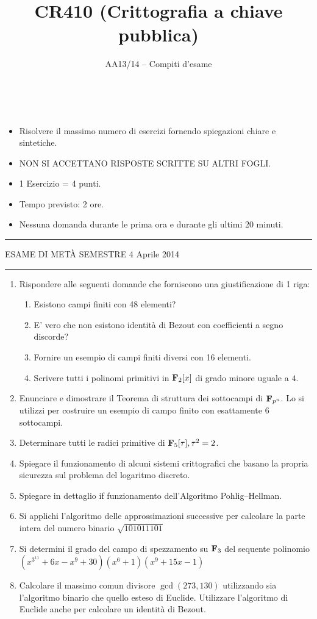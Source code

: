 \documentclass[a4paper,12pt]{article}
\title{CR410 (Crittografia a chiave pubblica)}
\author{AA13/14 -- Compiti d'esame}
\date{\ }
\begin{document}
\maketitle

\begin{itemize}
\item  Risolvere il massimo numero di esercizi fornendo spiegazioni chiare e sintetiche.
\item NON SI ACCETTANO RISPOSTE SCRITTE SU ALTRI FOGLI.
\item 1 Esercizio = 4 punti. 
\item Tempo previsto: 2 ore. 
\item Nessuna domanda durante le prima ora e durante gli ultimi 20 minuti.
\end{itemize}\bigskip

\hrule\smallskip

\noindent ESAME DI MET\`A SEMESTRE \hfill 4 Aprile 2014 

\hrule\smallskip

\begin{enumerate}
\item Rispondere alle seguenti domande che forniscono una giustificazione di 1 riga:
\begin{enumerate}
\item Esistono campi finiti con 48 elementi?
\item E' vero che non esistono identit\`a di Bezout con coefficienti a segno discorde?
\item Fornire un esempio di campi finiti diversi con 16 elementi.
\item Scrivere tutti i polinomi primitivi in ${\bf F}_2[x]$ di grado minore uguale a $4$.
\end{enumerate}
\item Enunciare e dimostrare il Teorema di struttura dei sottocampi di ${\bf F}_{p^n}$. Lo si utilizzi per costruire
un esempio di campo finito con esattamente $6$ sottocampi. 
\item Determinare tutti le radici primitive di ${\bf F}_{5}[\tau], \tau^2=2$.
\item Spiegare il funzionamento di alcuni sistemi crittografici che basano la propria sicurezza sul problema del 
logaritmo discreto.
\item Spiegare in dettaglio if funzionamento dell'Algoritmo Pohlig--Hellman.
\item Si applichi l'algoritmo delle approssimazioni successive per calcolare la parte intera del numero binario $\sqrt{101011101}$
\item Si determini il grado del campo di spezzamento su ${\bf F}_3$ del sequente polinomio $(x^{3^{11}}+6x-x^9+30)(x^6+1)(x^9+15x-1)$
\item Calcolare il massimo comun divisore  $\gcd(273,130)$ utilizzando sia l'algoritmo binario che quello esteso di Euclide. Utilizzare l'algoritmo di Euclide anche per 
calcolare un identit\`a di Bezout.
\end{enumerate}
\end{document}
